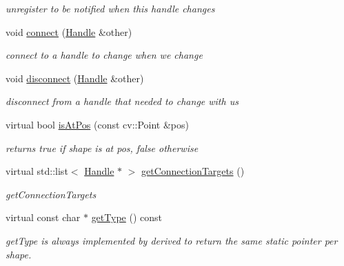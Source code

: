 \begin{DoxyCompactItemize}
\begin{DoxyCompactList}\small\item\em unregister to be notified when this handle changes \end{DoxyCompactList}\item 
void \hyperlink{classcanvascv_1_1Handle_aca046d84a3e080af8b44a09b4efd6469}{connect} (\hyperlink{classcanvascv_1_1Handle}{Handle} \&other)\hypertarget{classcanvascv_1_1Handle_aca046d84a3e080af8b44a09b4efd6469}{}\label{classcanvascv_1_1Handle_aca046d84a3e080af8b44a09b4efd6469}

\begin{DoxyCompactList}\small\item\em connect to a handle to change when we change \end{DoxyCompactList}\item 
void \hyperlink{classcanvascv_1_1Handle_afa78f039c0544fe98f20a0e40fb2bb45}{disconnect} (\hyperlink{classcanvascv_1_1Handle}{Handle} \&other)\hypertarget{classcanvascv_1_1Handle_afa78f039c0544fe98f20a0e40fb2bb45}{}\label{classcanvascv_1_1Handle_afa78f039c0544fe98f20a0e40fb2bb45}

\begin{DoxyCompactList}\small\item\em disconnect from a handle that needed to change with us \end{DoxyCompactList}\item 
virtual bool \hyperlink{classcanvascv_1_1Handle_a87de6edeed8ca14dbc5c3a7a127fa5a5}{is\+At\+Pos} (const cv\+::\+Point \&pos)\hypertarget{classcanvascv_1_1Handle_a87de6edeed8ca14dbc5c3a7a127fa5a5}{}\label{classcanvascv_1_1Handle_a87de6edeed8ca14dbc5c3a7a127fa5a5}

\begin{DoxyCompactList}\small\item\em returns true if shape is at pos, false otherwise \end{DoxyCompactList}\item 
virtual std\+::list$<$ \hyperlink{classcanvascv_1_1Handle}{Handle} $\ast$ $>$ \hyperlink{classcanvascv_1_1Handle_a6cf6d2c4ad6a01a1e9e7c27f3c29ed57}{get\+Connection\+Targets} ()
\begin{DoxyCompactList}\small\item\em get\+Connection\+Targets \end{DoxyCompactList}\item 
virtual const char $\ast$ \hyperlink{classcanvascv_1_1Handle_a6d255d8bfe17209610ffb0143903dbdc}{get\+Type} () const 
\begin{DoxyCompactList}\small\item\em get\+Type is always implemented by derived to return the same static pointer per shape. \end{DoxyCompactList}\end{DoxyCompactItemize}
